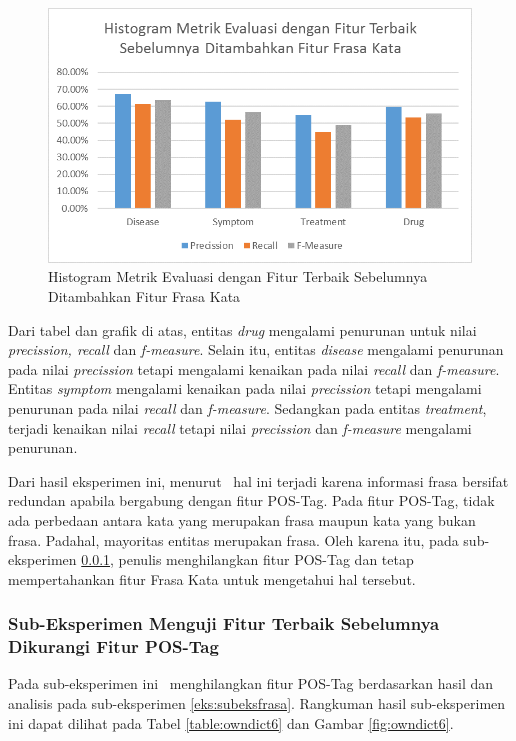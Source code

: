 	\begin{figure}
		\centering
		\includegraphics[width=0.85\linewidth]{images/histogram5}
		\caption{Histogram Metrik Evaluasi dengan Fitur Terbaik Sebelumnya Ditambahkan Fitur Frasa Kata}
		\label{fig:owndict5}
	\end{figure}

	Dari tabel dan grafik di atas, entitas \textit{drug} mengalami penurunan untuk nilai \textit{precission, recall} dan \textit{f-measure}. Selain itu, entitas \textit{disease} mengalami penurunan pada nilai \textit{precission} tetapi mengalami kenaikan pada nilai \textit{recall} dan \textit{f-measure}. Entitas \textit{symptom} mengalami kenaikan pada nilai \textit{precission} tetapi mengalami penurunan pada nilai \textit{recall} dan \textit{f-measure}. Sedangkan pada entitas \textit{treatment}, terjadi kenaikan nilai \textit{recall} tetapi nilai \textit{precission} dan \textit{f-measure} mengalami penurunan. 
	
	Dari hasil eksperimen ini, menurut \saya~hal ini terjadi karena informasi frasa bersifat redundan apabila bergabung dengan fitur POS-Tag. Pada fitur POS-Tag, tidak ada perbedaan antara kata yang merupakan frasa maupun kata yang bukan frasa. Padahal, mayoritas entitas merupakan frasa. Oleh karena itu, pada sub-eksperimen \ref{eks:subeksminpostag}, penulis menghilangkan fitur POS-Tag dan tetap mempertahankan fitur Frasa Kata untuk mengetahui hal tersebut. 
	
	\subsubsection{Sub-Eksperimen Menguji Fitur Terbaik Sebelumnya Dikurangi Fitur POS-Tag}\label{eks:subeksminpostag}
	Pada sub-eksperimen ini \saya~menghilangkan fitur POS-Tag berdasarkan hasil dan analisis pada sub-eksperimen \ref{eks:subeksfrasa}. Rangkuman hasil sub-eksperimen ini dapat dilihat pada Tabel \ref{table:owndict6} dan Gambar \ref{fig:owndict6}.
	
